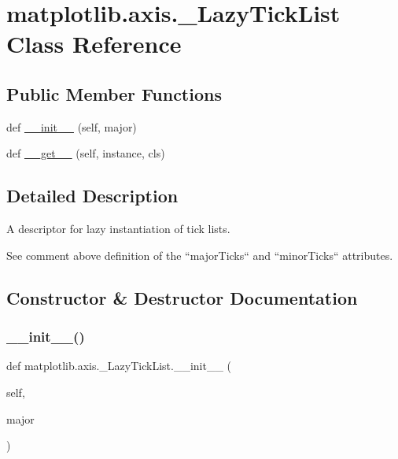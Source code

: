 \hypertarget{classmatplotlib_1_1axis_1_1__LazyTickList}{}\section{matplotlib.\+axis.\+\_\+\+Lazy\+Tick\+List Class Reference}
\label{classmatplotlib_1_1axis_1_1__LazyTickList}
\subsection*{Public Member Functions}
\begin{DoxyCompactItemize}
\item 
def \hyperlink{classmatplotlib_1_1axis_1_1__LazyTickList_a6b461d0143a260e6d3e617bcbc976b9b}{\+\_\+\+\_\+init\+\_\+\+\_\+} (self, major)
\item 
def \hyperlink{classmatplotlib_1_1axis_1_1__LazyTickList_a061753076744ff65e0966216bb12925f}{\+\_\+\+\_\+get\+\_\+\+\_\+} (self, instance, cls)
\end{DoxyCompactItemize}


\subsection{Detailed Description}
\begin{DoxyVerb}A descriptor for lazy instantiation of tick lists.

See comment above definition of the ``majorTicks`` and ``minorTicks``
attributes.
\end{DoxyVerb}
 

\subsection{Constructor \& Destructor Documentation}
\mbox{\label{classmatplotlib_1_1axis_1_1__LazyTickList_a6b461d0143a260e6d3e617bcbc976b9b}} 
\subsubsection{\texorpdfstring{\+\_\+\+\_\+init\+\_\+\+\_\+()}{\_\_init\_\_()}}
{\footnotesize\ttfamily def matplotlib.\+axis.\+\_\+\+Lazy\+Tick\+List.\+\_\+\+\_\+init\+\_\+\+\_\+ (\begin{DoxyParamCaption}\item[{}]{self,  }\item[{}]{major }\end{DoxyParamCaption})}



